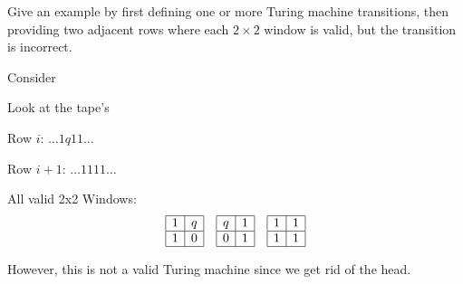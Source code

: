 \documentclass[12pt, letterpaper]{article}
\begin{document}
\begin{subproblem}{}
    Give an example by first defining one or more Turing machine transitions, then providing two adjacent rows where each $2 \times 2$ window is valid, but the transition is incorrect. 
\end{subproblem}
\begin{problemproof}
    Consider \begin{center}
    \end{center}
    \begin{center}
    \end{center}

    Look at the tape's

    Row $i$: \hspace{17pt} $\dots 1 q 1 1 \dots$

    Row $i+1$: $\dots 1 1 1 1 \dots$

    All valid 2x2 Windows:
    \[\begin{array}{|c|c|}
        \hline
        1 & q \\
        \hline
        1 & 0 \\
        \hline
    \end{array}
    \quad
    \begin{array}{|c|c|}
        \hline
        q & 1 \\
        \hline
        0 & 1 \\
        \hline
    \end{array}
    \quad
    \begin{array}{|c|c|}
        \hline
        1 & 1 \\
        \hline
        1 & 1 \\
        \hline
    \end{array}\]

    However, this is not a valid Turing machine since we get rid of the head.
\end{problemproof}
\end{document}
